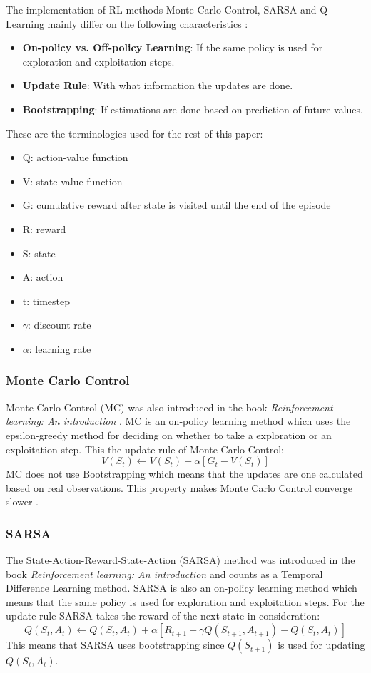 \documentclass[conference]{IEEEtran}
\begin{document}
The implementation of RL methods Monte Carlo Control, SARSA and Q-Learning mainly differ on the following characteristics \cite{b4}:  
\begin{itemize}
	\item \textbf{On-policy vs. Off-policy Learning}: If the same policy is used for exploration and exploitation steps. 
	\item \textbf{Update Rule}: With what information the updates are done. 
	\item \textbf{Bootstrapping}: If estimations are done based on prediction of future values. 
\end{itemize}

These are the terminologies used for the rest of this paper: 
\begin{itemize}
	\item Q: action-value function
	\item V: state-value function
	\item G: cumulative reward after state is visited until the end of the episode 
	\item R: reward
	\item S: state
	\item A: action
	\item t: timestep
	\item $\gamma$: discount rate
	\item $\alpha$: learning rate
\end{itemize}

\subsubsection{Monte Carlo Control}
Monte Carlo Control (MC) was also introduced in the book \textit{Reinforcement learning: An introduction} \cite{b4}.
MC is an on-policy learning method which uses the epsilon-greedy method for deciding on whether to take a exploration or an exploitation step.
This the update rule of Monte Carlo Control:
\begin{equation*}
	V(S_t) \leftarrow V(S_t) + \alpha [G_t - V(S_t)] \tag{1}
\end{equation*}
MC does not use Bootstrapping which means that the updates are one calculated based on real observations. 
This property makes Monte Carlo Control converge slower \cite{b4}.  

\subsubsection{SARSA}
The State-Action-Reward-State-Action (SARSA) method was introduced in the book \textit{Reinforcement learning: An introduction} \cite{b4} and counts as a Temporal Difference Learning method.
SARSA is also an on-policy learning method which means that the same policy is used for exploration and exploitation steps.  
For the update rule SARSA takes the reward of the next state in consideration:
\begin{equation*}
	Q(S_t, A_t) \leftarrow Q(S_t, A_t) + \alpha [R_{t+1} + \gamma Q(S_{t+1}, A_{t+1}) - Q(S_t, A_t)] \tag{2}
\end{equation*}
This means that SARSA uses bootstrapping since $Q(S_{t+1})$ is used for updating $Q(S_t, A_t)$. 
\end{document}
